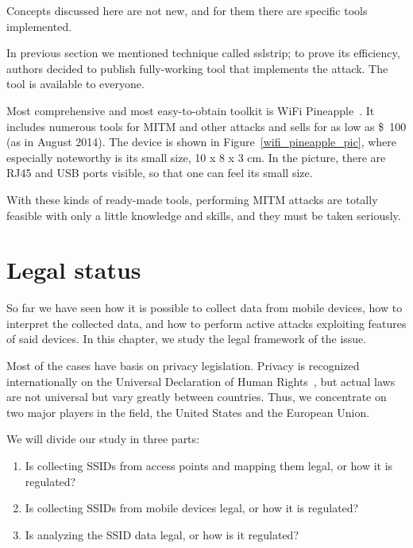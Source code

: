 \documentclass[12pt,a4paper,oneside,pdftex]{report}
\begin{document}
Concepts discussed here are not new, and for them there are specific tools implemented.

In previous section we mentioned technique called sslstrip; to prove its efficiency, authors decided to publish fully-working tool that implements the attack. The tool is available to everyone.~\cite{marlinspike2009new}

Most comprehensive and most easy-to-obtain toolkit is WiFi Pineapple~\cite{wifipineapple}. It includes numerous tools for MITM and other attacks and sells for as low as \$~100 (as in August 2014). The device is shown in Figure~\ref{wifi_pineapple_pic}, where especially noteworthy is its small size, 10 x 8 x 3 cm. In the picture, there are RJ45 and USB ports visible, so that one can feel its small size.

With these kinds of ready-made tools, performing MITM attacks are totally feasible with only a little knowledge and skills, and they must be taken seriously.



\chapter{Legal status}
\label{chapter:legal}

So far we have seen how it is possible to collect data from mobile devices, how to interpret the collected data, and how to perform active attacks exploiting features of said devices. In this chapter, we study the legal framework of the issue.

Most of the cases have basis on privacy legislation. Privacy is recognized internationally on the Universal Declaration of Human Rights~\cite{udhr}, but actual laws are not universal but vary greatly between countries. Thus, we concentrate on two major players in the field, the United States and the European Union.

We will divide our study in three parts:
\begin{enumerate}
    \item Is collecting SSIDs from access points and mapping them legal, or how it is regulated?
    \item Is collecting SSIDs from mobile devices legal, or how it is regulated?
    \item Is analyzing the SSID data legal, or how is it regulated?
\end{enumerate}
\end{document}
